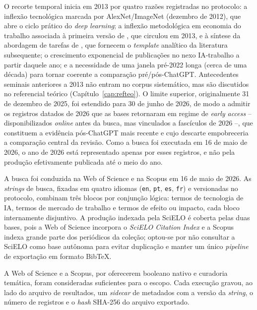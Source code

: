 O recorte temporal inicia em 2013 por quatro razões registradas no protocolo: a inflexão tecnológica marcada por AlexNet/ImageNet (dezembro de 2012), que abre o ciclo prático do \textit{deep learning}; a inflexão metodológica em economia do trabalho associada à primeira versão de \textcite{frey2017}, que circulou em 2013, e à síntese da abordagem de tarefas de \textcite{autor2013task}, que fornecem o \textit{template} analítico da literatura subsequente; o crescimento exponencial de publicações no nexo IA-trabalho a partir daquele ano; e a necessidade de uma janela pré-2022 longa (cerca de uma década) para tornar coerente a comparação pré/pós-ChatGPT. Antecedentes seminais anteriores a 2013 não entram no corpus sistemático, mas são discutidos no referencial teórico (Capítulo~\ref{cap:refteo}). O limite superior, originalmente 31 de dezembro de 2025, foi estendido para 30 de junho de 2026, de modo a admitir os registros datados de 2026 que as bases retornaram em regime de \textit{early access} -- disponibilizados \textit{online} antes da busca, mas vinculados a fascículos de 2026 --, que constituem a evidência pós-ChatGPT mais recente e cujo descarte empobreceria a comparação central da revisão. Como a busca foi executada em 16 de maio de 2026, o ano de 2026 está representado apenas por esses registros, e não pela produção efetivamente publicada até o meio do ano.


A busca foi conduzida na Web of Science e na Scopus em 16 de maio de 2026. As \textit{strings} de busca, fixadas em quatro idiomas (\texttt{en}, \texttt{pt}, \texttt{es}, \texttt{fr}) e versionadas no protocolo, combinam três blocos por conjunção lógica: termos de tecnologia de IA, termos de mercado de trabalho e termos de efeito ou impacto, cada bloco internamente disjuntivo. A produção indexada pela SciELO é coberta pelas duas bases, pois a Web of Science incorpora o \textit{SciELO Citation Index} e a Scopus indexa grande parte dos periódicos da coleção; optou-se por não consultar a SciELO como base autônoma para evitar duplicação e manter um único \textit{pipeline} de exportação em formato BibTeX.

A Web of Science e a Scopus, por oferecerem booleano nativo e curadoria temática, foram consideradas suficientes para o escopo. Cada execução gravou, ao lado do arquivo de resultados, um \textit{sidecar} de metadados com a versão da \textit{string}, o número de registros e o \textit{hash} SHA-256 do arquivo exportado.

